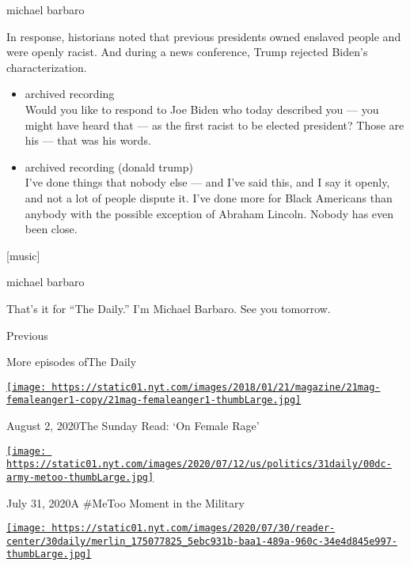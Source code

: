 michael barbaro

In response, historians noted that previous presidents owned enslaved
people and were openly racist. And during a news conference, Trump
rejected Biden's characterization.

\begin{itemize}
\item
  archived recording\\
  Would you like to respond to Joe Biden who today described you --- you
  might have heard that --- as the first racist to be elected president?
  Those are his --- that was his words.
\item
  archived recording (donald trump)\\
  I've done things that nobody else --- and I've said this, and I say it
  openly, and not a lot of people dispute it. I've done more for Black
  Americans than anybody with the possible exception of Abraham Lincoln.
  Nobody has even been close.
\end{itemize}

{[}music{]}

michael barbaro

That's it for ``The Daily.'' I'm Michael Barbaro. See you tomorrow.

Previous

More episodes ofThe Daily

\href{https://www.nytimes.com/2020/08/02/podcasts/the-daily/on-female-rage.html?action=click\&module=audio-series-bar\&region=header\&pgtype=Article}{\texttt{[image: https://static01.nyt.com/images/2018/01/21/magazine/21mag-femaleanger1-copy/21mag-femaleanger1-thumbLarge.jpg]}}

August 2, 2020The Sunday Read: `On Female Rage'

\href{https://www.nytimes.com/2020/07/31/podcasts/the-daily/vanessa-guillen-military-metoo.html?action=click\&module=audio-series-bar\&region=header\&pgtype=Article}{\texttt{[image: https://static01.nyt.com/images/2020/07/12/us/politics/31daily/00dc-army-metoo-thumbLarge.jpg]}}

July 31, 2020A \#MeToo Moment in the Military

\href{https://www.nytimes.com/2020/07/30/podcasts/the-daily/congress-facebook-amazon-google-apple.html?action=click\&module=audio-series-bar\&region=header\&pgtype=Article}{\texttt{[image: https://static01.nyt.com/images/2020/07/30/reader-center/30daily/merlin\_175077825\_5ebc931b-baa1-489a-960c-34e4d845e997-thumbLarge.jpg]}}


